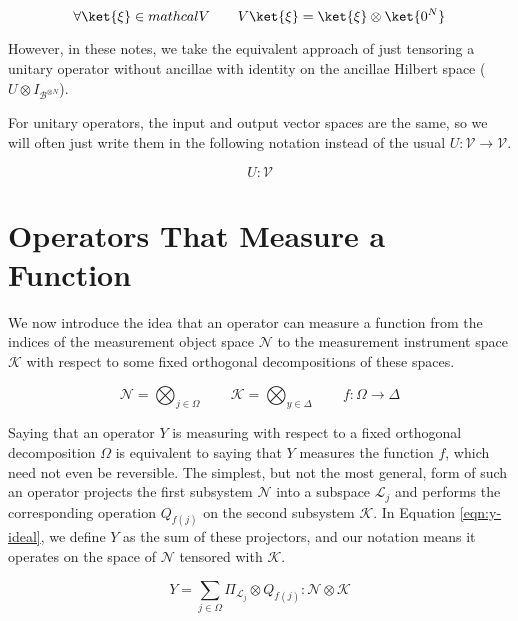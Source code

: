 \begin{equation}
\forall \ket{\xi} \in mathcal{V} \qquad V\ket{\xi} = \ket{\xi} \otimes \ket{0^N}
\end{equation}

However, in these notes, we take the equivalent approach of just
tensoring a unitary operator without ancillae with identity on the
ancillae Hilbert space ($U \otimes I_{\mathcal{B}^{\otimes N}}$).

For unitary operators, the input and output vector spaces are the same,
so we will often just write them in the following notation instead of
the usual $U: \mathcal{V} \rightarrow \mathcal{V}$.

\begin{equation}
U : \mathcal{V}
\end{equation}

\section{Operators That Measure a Function}
\label{sec:meas-func}

We now introduce the idea that an operator can measure a function
from the indices of the measurement object space $\mathcal{N}$
to the measurement instrument space $\mathcal{K}$ with respect to
some fixed orthogonal decompositions of these spaces.

\begin{equation}
\mathcal{N} = \bigotimes_{j \in \Omega} \qquad
\mathcal{K} = \bigotimes_{y \in \Delta} \qquad
f:\Omega \rightarrow \Delta
\end{equation}

Saying that an operator $Y$ is measuring with respect to a fixed
orthogonal decomposition $\Omega$ is equivalent to saying that
$Y$ measures the function $f$, which need not even be reversible.
The simplest, but not the most general, form of such an operator projects
the first subsystem $\mathcal{N}$ into a subspace $\mathcal{L}_j$
and performs the
corresponding operation $Q_{f(j)}$ on the second subsystem $\mathcal{K}$.
In Equation \ref{eqn:y-ideal}, we define $Y$ as the sum of these projectors,
and our notation means it operates on the space of $\mathcal{N}$
tensored with $\mathcal{K}$.

\begin{equation}
Y = \sum_{j \in \Omega} \Pi_{\mathcal{L}_j} \otimes Q_{f(j)} : \mathcal{N} \otimes \mathcal{K}
\label{eqn:y-ideal}
\end{equation}
